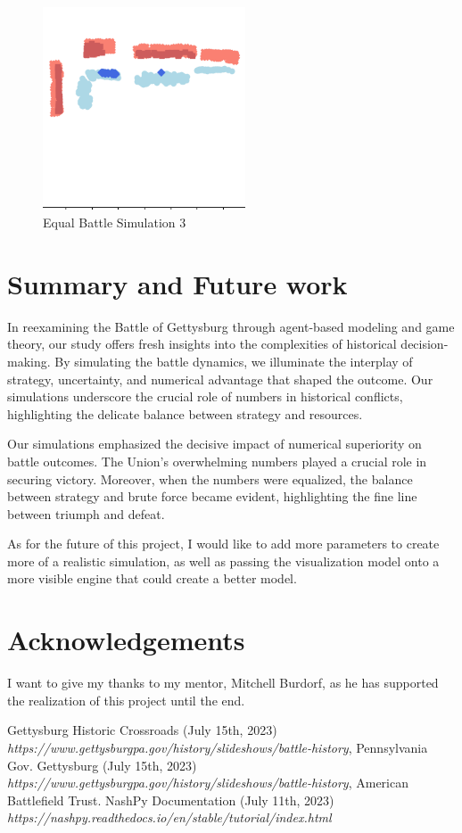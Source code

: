 \documentclass[final,5p,times,twocolumn,authoryear]{elsarticle}
\begin{document}
\begin{figure}[!ht]
  \centering
      \includegraphics[width=6cm]{Equal_battle_3.png}
      \caption{Equal Battle Simulation 3}
      \label{fig:Simulation}
  \centering
\end{figure}

\section{Summary and Future work}
In reexamining the Battle of Gettysburg through agent-based modeling and game theory, our study offers fresh insights into the complexities of historical decision-making. By simulating the battle dynamics, we illuminate the interplay of strategy, uncertainty, and numerical advantage that shaped the outcome. Our simulations underscore the crucial role of numbers in historical conflicts, highlighting the delicate balance between strategy and resources.

Our simulations emphasized the decisive impact of numerical superiority on battle outcomes. The Union's overwhelming numbers played a crucial role in securing victory. Moreover, when the numbers were equalized, the balance between strategy and brute force became evident, highlighting the fine line between triumph and defeat.

As for the future of this project, I would like to add more parameters to create more of a realistic simulation, as well as passing the visualization model onto a more visible engine that could create a better model.


\section*{Acknowledgements}
I want to give my thanks to my mentor, Mitchell Burdorf, as he has supported the realization of this project until the end.

 
\begin{thebibliography}{9}
\bibitem  Gettysburg Historic Crossroads (July 15th, 2023) \emph {https://www.gettysburgpa.gov/history/slideshows/battle-history}, Pennsylvania Gov.
\bibitem  Gettysburg (July 15th, 2023) \emph {https://www.gettysburgpa.gov/history/slideshows/battle-history}, American Battlefield Trust.
\bibitem  NashPy Documentation (July 11th, 2023) \emph{https://nashpy.readthedocs.io/en/stable/tutorial/index.html}
\end{thebibliography}
\end{document}
